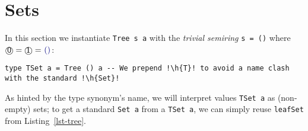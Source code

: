 \documentclass[crc,english]{programming}
\newcommand{\hcode}[1]{{\color{darkblue} \lstinline[keywordstyle={}]|#1|}} %
\newcommand{\h}[1]{{\itshape\color{grayblue}#1}} %
\newcommand{\zero}{\raisebox{-0.2mm}{\textcircled{\textsf{0}}}\xspace}
\newcommand{\one}{\raisebox{-0.2mm}{\textcircled{\textsf{\hspace{-0.2mm}1}}}\xspace}
\begin{document}
\vspace{-1mm}
\section{Sets}\label{sec-set}
\vspace{-0.5mm}

In this section we instantiate \hcode{Tree s a} with the \emph{trivial semiring}
\hcode{s = ()} where $\zero = \one = \text{\hcode{()}}$:

\begin{lstlisting}
type TSet a = Tree () a -- We prepend !\h{T}! to avoid a name clash with the standard !\h{Set}!
\end{lstlisting}

\noindent
As hinted by the type synonym's name, we will interpret values \hcode{TSet a} as
(non-empty) sets; to get a standard \hcode{Set a} from a \hcode{TSet a}, we can
simply reuse \hcode{leafSet} from Listing~\ref{lst-tree}.
\end{document}
